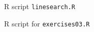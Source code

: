 \documentclass{article}
\begin{document}

\pagebreak
R script \texttt{linesearch.R}


\pagebreak
R script for \texttt{exercises03.R}


\end{document}
